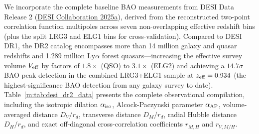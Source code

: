 \documentclass[aps,prd,preprint,superscriptaddress,nofootinbib]{revtex4-2}
\begin{document}
We incorporate the complete baseline BAO measurements from DESI Data Release 2 (\href{https://arxiv.org/abs/2503.14738}{DESI Collaboration 2025a}), derived from the reconstructed two-point correlation function multipoles across seven non-overlapping effective redshift bins (plus the split LRG3 and ELG1 bins for cross-validation). Compared to DESI DR1, the DR2 catalog encompasses more than 14 million galaxy and quasar redshifts and 1.289 million $\text{Ly}\alpha$ forest quasars---increasing the effective survey volume $V_{\rm eff}$ by factors of $1.8\times$ (QSO) to $3.1\times$ (ELG2) and achieving a $14.7\sigma$ BAO peak detection in the combined LRG3+ELG1 sample at $z_{\rm eff} = 0.934$ (the highest-significance BAO detection from any galaxy survey to date). Table~\ref{m:tab:desi_dr2_data} presents the complete observational compilation, including the isotropic dilation $\alpha_{\rm iso}$, Alcock-Paczynski parameter $\alpha_{\rm AP}$, volume-averaged distance $D_V/r_d$, transverse distance $D_M/r_d$, radial Hubble distance $D_H/r_d$, and exact off-diagonal cross-correlation coefficients $r_{M,H}$ and $r_{V,M/H}$.
\end{document}

